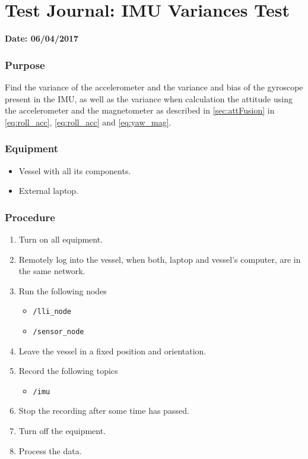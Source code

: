 \chapter{Test Journal: IMU Variances Test} \label{app:IMUVariances}

\textbf{Date: 06/04/2017}

\subsection*{Purpose}
Find the variance of the accelerometer and the variance and bias of the gyroscope present in the IMU, as well as the variance when calculation the attitude using the accelerometer and the magnetometer as described in \autoref{sec:attFusion} in \autoref{eq:roll_acc}, \ref{eq:roll_acc} and \ref{eq:yaw_mag}.

\subsection*{Equipment}
\begin{itemize}
    \item Vessel with all its components.
    \item External laptop.
\end{itemize}

\subsection*{Procedure}
\begin{enumerate}
    \item Turn on all equipment.
    \item Remotely log into the vessel, when both, laptop and vessel's computer, are in the same network.
    \item Run the following nodes
    \begin{itemize}
        \item \lstinline[style=cinline]{/lli_node}
        \item \lstinline[style=cinline]{/sensor_node}
    \end{itemize}
    \item Leave the vessel in a fixed position and orientation.
    \item Record the following topics
    \begin{itemize}
        \item \lstinline[style=cinline]{/imu}      
    \end{itemize}
    \item Stop the recording after some time has passed.
    \item Turn off the equipment.
    \item Process the data.
\end{enumerate}

